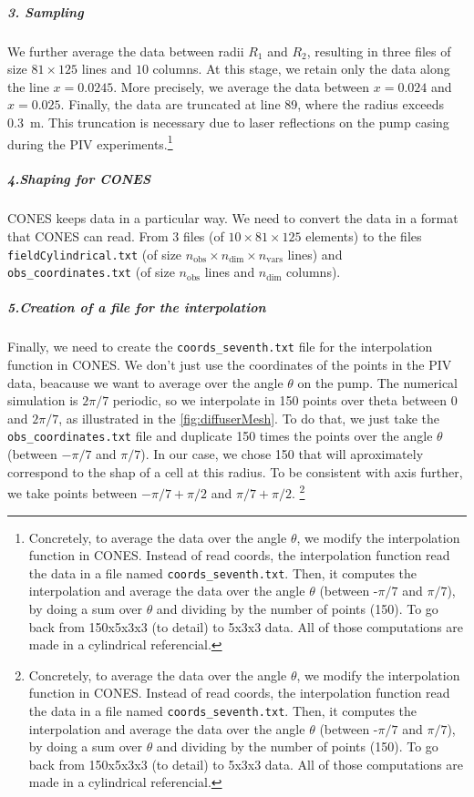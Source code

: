 \subparagraph{3. Sampling}

We further average the data between radii \(R_1\) and \(R_2\), resulting in three files of size $81 \times 125$ lines and $10$ columns.
At this stage, we retain only the data along the line \(x = 0.0245\). More precisely, we average the data between \(x = 0.024\) and \(x = 0.025\).
Finally, the data are truncated at line 89, where the radius exceeds 0.3~m. This truncation is necessary due to laser reflections on the pump casing during the PIV experiments.\footnote{Concretely, to average the data over the angle \(\theta\), we modify the interpolation function in CONES.
Instead of read coords, the interpolation function read the data in a file named \texttt{coords\_seventh.txt}.
Then, it computes the interpolation and average the data over the angle \(\theta\) (between -$\pi/7$ and $\pi/7$), by doing a sum over \(\theta\) and dividing by the number of points (150). To go back from 150x5x3x3 (to detail) to 5x3x3 data. All of those computations are made in a cylindrical referencial.}


\subparagraph{4.Shaping for CONES}
CONES keeps data in a particular way. We need to convert the data in a format that CONES can read.
From 3 files (of $10 \times 81 \times 125$ elements) to the files 
\texttt{fieldCylindrical.txt} (of size $n_{\text{obs}} \times n_{\text{dim}} \times n_{\text{vars}}$ lines) 
and \texttt{obs\_coordinates.txt} (of size $n_{\text{obs}}$ lines and $n_{\text{dim}}$ columns).

\subparagraph{5.Creation of a file for the interpolation}

Finally, we need to create the \texttt{coords\_seventh.txt} file for the interpolation function in CONES.
We don't just use the coordinates of the points in the PIV data, beacause we want to average over the angle \(\theta\) on the pump. The numerical simulation is $2\pi/7$ periodic, so we interpolate in 150 points over theta between 0 and $2\pi/7$, as illustrated in the \autoref{fig:diffuserMesh}. %
To do that, we just take the \texttt{obs\_coordinates.txt} file and duplicate 150 times the points over the angle \(\theta\) (between $-\pi/7$ and $\pi/7$). In our case, we chose 150 that will aproximately correspond to the shap of a cell at this radius.
To be consistent with axis further, we take points between $-\pi/7 + \pi/2$ and $\pi/7 + \pi/2$.
\footnote{Concretely, to average the data over the angle \(\theta\), we modify the interpolation function in CONES.
Instead of read coords, the interpolation function read the data in a file named \texttt{coords\_seventh.txt}.
Then, it computes the interpolation and average the data over the angle \(\theta\) (between -$\pi/7$ and $\pi/7$), by doing a sum over \(\theta\) and dividing by the number of points (150). To go back from 150x5x3x3 (to detail) to 5x3x3 data. All of those computations are made in a cylindrical referencial.}

